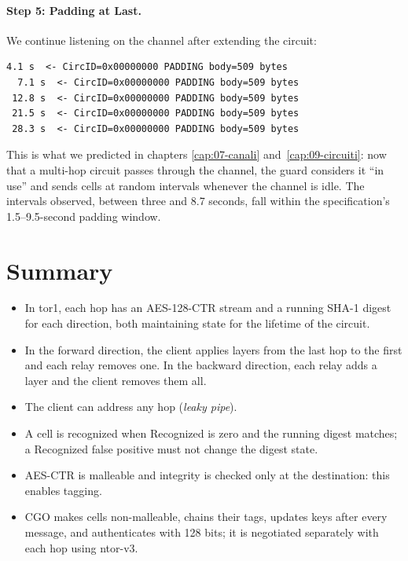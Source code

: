 \paragraph{Step 5: Padding at Last.} We continue listening on the channel after extending the circuit:
\begin{lstlisting}[numbers=none]
  4.1 s  <- CircID=0x00000000 PADDING body=509 bytes
  7.1 s  <- CircID=0x00000000 PADDING body=509 bytes
 12.8 s  <- CircID=0x00000000 PADDING body=509 bytes
 21.5 s  <- CircID=0x00000000 PADDING body=509 bytes
 28.3 s  <- CircID=0x00000000 PADDING body=509 bytes
\end{lstlisting}
This is what we predicted in chapters \ref{cap:07-canali} and~\ref{cap:09-circuiti}: now that a multi-hop circuit passes through the channel, the guard considers it \enquote{in use} and sends  cells at random intervals whenever the channel is idle. The intervals observed, between three and 8.7 seconds, fall within the specification's 1.5--9.5-second padding window.

\section*{Summary}
\begin{itemize}
  \item In tor1, each hop has an AES-128-CTR stream and a running SHA-1 digest for each direction, both maintaining state for the lifetime of the circuit.
  \item In the forward direction, the client applies layers from the last hop to the first and each relay removes one. In the backward direction, each relay adds a layer and the client removes them all.
  \item The client can address any hop (\emph{leaky pipe}).
  \item A cell is recognized when Recognized is zero and the running digest matches; a Recognized false positive must not change the digest state.
  \item AES-CTR is malleable and integrity is checked only at the destination: this enables tagging.
  \item CGO makes cells non-malleable, chains their tags, updates keys after every message, and authenticates with 128 bits; it is negotiated separately with each hop using ntor-v3.
\end{itemize}

